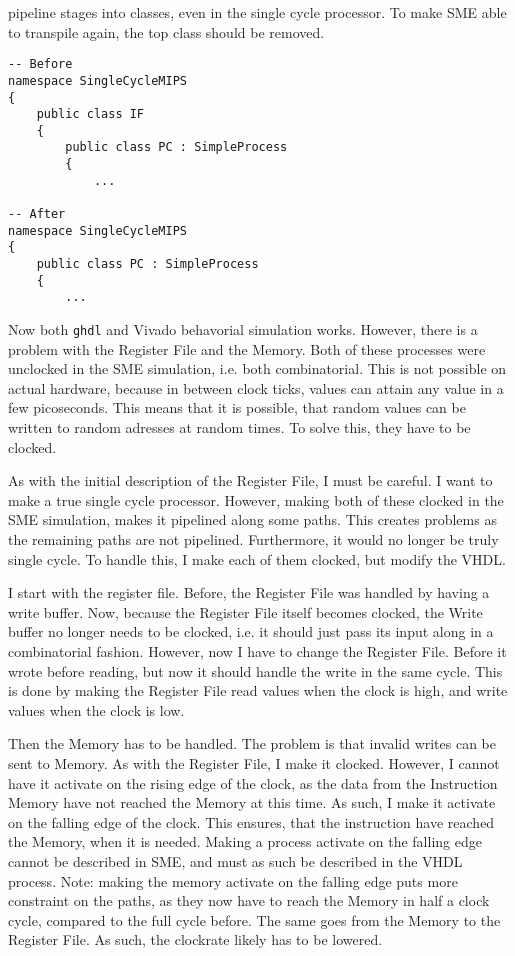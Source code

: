 pipeline stages into classes, even in the single cycle processor. To make SME
able to transpile again, the top class should be removed.
\begin{lstlisting}
-- Before
namespace SingleCycleMIPS
{
    public class IF
    {
        public class PC : SimpleProcess
        {
            ...

-- After
namespace SingleCycleMIPS
{
    public class PC : SimpleProcess
    {
        ...
\end{lstlisting}
Now both \texttt{ghdl} and Vivado behavorial simulation works. However, there is
a problem with the Register File and the Memory. Both of these processes
were unclocked in the SME simulation, i.e. both combinatorial. This is not
possible on actual hardware, because in between clock ticks, values can attain
any value in a few picoseconds. This means that it is possible, that random
values can be written to random adresses at random times. To solve this, they
have to be clocked.

As with the initial description of the Register File, I must be careful. I want
to make a true single cycle processor. However, making both of these clocked in
the SME simulation, makes it pipelined along some paths. This creates problems
as the remaining paths are not pipelined. Furthermore, it would no longer be
truly single cycle. To handle this, I make each of them clocked, but modify the
VHDL.

I start with the register file. Before, the Register File was handled by having
a write buffer. Now, because the Register File itself becomes clocked, the
Write buffer no longer needs to be clocked, i.e. it should just pass its input
along in a combinatorial fashion. However, now I have to change the Register
File. Before it wrote before reading, but now it should handle the write in the
same cycle. This is done by making the Register File read values when the clock
is high, and write values when the clock is low.

Then the Memory has to be handled. The problem is that invalid writes can be
sent to Memory. As with the Register File, I make it clocked. However, I cannot
have it activate on the rising edge of the clock, as the data from the
Instruction Memory have not reached the Memory at this time. As such, I make it
activate on the falling edge of the clock. This ensures, that the instruction
have reached the Memory, when it is needed. Making a process activate on the
falling edge cannot be described in SME, and must as such be described in the
VHDL process. Note: making the memory activate on the falling edge puts more
constraint on the paths, as they now have to reach the Memory in half a clock
cycle, compared to the full cycle before. The same goes from the Memory to the
Register File. As such, the clockrate likely has to be lowered.

